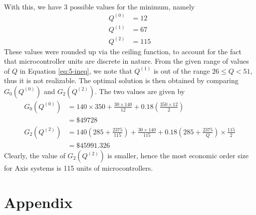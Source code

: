 \documentclass[12pt]{article}
\begin{document}
\begin{align*}
\end{align*} With this, we have 3 possible values for the minimum, namely \begin{align*}
    Q^{(0)} &= 12 \\ 
    Q^{(1)} &= 67 \\ 
    Q^{(2)} &= 115 
\end{align*} These values were rounded up via the ceiling function, to account for the fact that microcontroller units are discrete in nature. From the given range of values of $Q$ in Equation \ref{eq:5-ineq}, we note that $Q^{(1)}$ is out of the range $26 \leq Q< 51$, thus it is not realizable. The optimal solution is then obtained by comparing $G_0(Q^{(0)})$ and $G_2(Q^{(2)})$. The two values are given by \begin{align*}
    G_0\left(Q^{(0)}\right) &= 140\times 350 + \frac{30 \times 140}{12} + 0.18\left( \frac{350\times 12}{2}  \right) \\ 
    &= \boxed{\$ 49728} \\ 
    G_2\left(Q^{(2)}\right) &= 140\left( 285+ \frac{2375}{115} \right) + \frac{30\times 140}{115} + 0.18 \left( 285 + \frac{2375}{Q} \right) \times \frac{115}{2} \\ 
    &= \boxed{\$ 45991.326}
\end{align*} Clearly, the value of $G_2(Q^{(2)})$ is smaller, hence the most economic order size for Axis systems is 115 units of microcontrollers. 

\newpage

\section*{Appendix}
\end{document}
